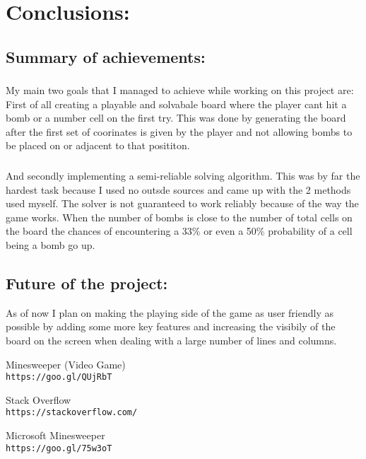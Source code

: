 \documentclass{report}
\begin{document}
\chapter*{Conclusions:}
\section*{Summary of achievements:}
\subsection*{}
My main two goals that I managed to achieve while working on this project are:
First of all creating a playable and solvabale board where the player cant hit a bomb or a number cell on the first try. This was done by generating 
the board after the first set of coorinates is given by the player and not allowing bombs to be placed on or adjacent to
that posititon.
\subsection*{}
And secondly implementing a semi-reliable solving algorithm. This was by far the hardest task because I used no outsde sources
and came up with the 2 methods used myself. The solver is not guaranteed to work reliably because of the way the game works. When the number
of bombs is close to the number of total cells on the board the chances of encountering a 33\% or even a 50\% probability of a cell being a bomb go up.

\section*{Future of the project:}
As of now I plan on making the playing side of the game as user friendly as possible by adding some more key features and increasing
the visibily of the board on the screen when dealing with a large number of lines and columns.

\begin{thebibliography}{9}
Minesweeper (Video Game)
\\\texttt{https://goo.gl/QUjRbT}

Stack Overflow
\\\texttt{https://stackoverflow.com/}

Microsoft Minesweeper
\\\texttt{https://goo.gl/75w3oT}

\end{thebibliography}
\end{document}

